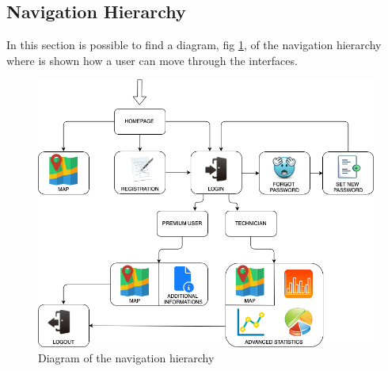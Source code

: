 \documentclass{article}
\begin{document}
\subsection{Navigation Hierarchy}
In this section is possible to find a diagram, fig \ref{fig:navigation}, of the navigation hierarchy where is shown how a user can move through the interfaces.\\
\begin{figure}[H]
    \centering
    \includegraphics[width=0.68\linewidth]{image/USERFLOW.png}
    \caption{Diagram of the navigation hierarchy}
    \label{fig:navigation}
\end{figure}
\end{document}
